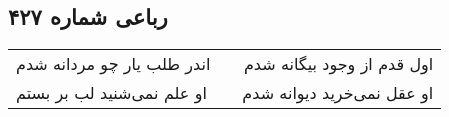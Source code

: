 \begin{center}
\section*{رباعی شماره ۴۲۷}
\label{sec:sh427}
\begin{longtable}{l p{0.5cm} r}
اندر طلب یار چو مردانه شدم
&&
اول قدم از وجود بیگانه شدم
\\
او علم نمی‌شنید لب بر بستم
&&
او عقل نمی‌خرید دیوانه شدم
\\
\end{longtable}
\end{center}
